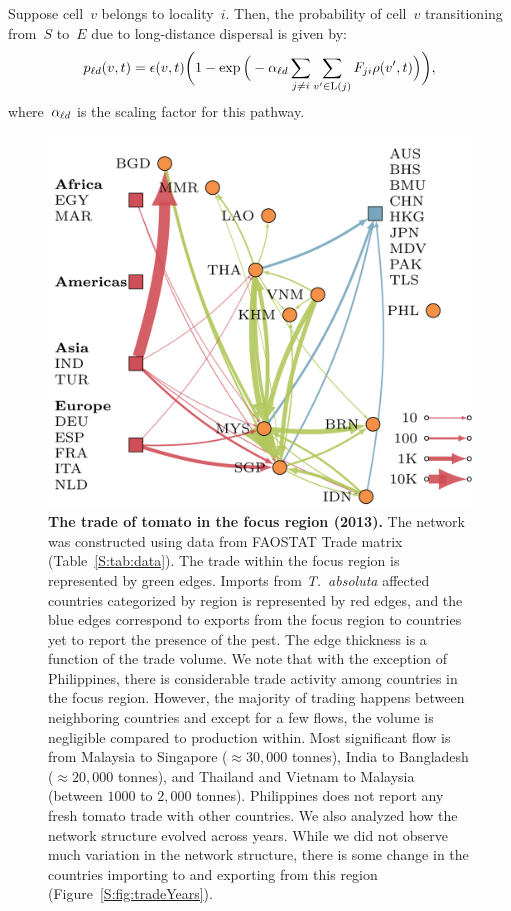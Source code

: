 \documentclass[11pt]{article}
\newcommand{\tuta}{\emph{T.~absoluta}}
\newcommand{\infest}{\rho}
\newcommand{\suitable}{\epsilon}
\theoremstyle{definition}
\begin{document}
Suppose cell~$v$ belongs to locality~$i$. Then, the probability of cell~$v$
transitioning from~$S$ to~$E$ due to long-distance dispersal is given by:
\begin{align}\label{eqn:plocal}
    \pld(v,t)=\suitable(v,t)\bigg(1-
    \exp\Big(-\ald\sum_{j\ne i}\sum_{v'\in\locality(j)}F_{ji}\infest(v',t)\Big)\bigg),
\end{align}
where~$\alpha_{\ell d}$ is the scaling factor for this pathway.
\begin{figure}[t]
\centering
\includegraphics[width=.6\textwidth]{../international_trade/results/network_plots/sea_2013_tomato.pdf}
\caption{\textbf{The trade of tomato in the focus region (2013).} The
network was constructed using data from FAOSTAT Trade matrix
(Table~\ref{S:tab:data}).  The trade within the focus region is represented
by green edges. Imports from \tuta{} affected countries categorized by
region is represented by red edges, and the blue edges correspond to
exports from the focus region to countries yet to report the presence of
the pest. The edge thickness is a function of the trade volume. We note
that with the exception of Philippines, there is considerable trade
activity among countries in the focus region. However, the majority of
trading happens between neighboring countries and except for a few flows,
the volume is negligible compared to production within. Most significant
flow is from Malaysia to Singapore ($\approx30,000$ tonnes), India to
Bangladesh ($\approx20,000$ tonnes), and Thailand and Vietnam to Malaysia
(between $1000$ to $2,000$ tonnes). Philippines does not report any fresh
tomato trade with other countries.  We also analyzed how the network
structure evolved across years. While we did not observe much variation in
the network structure, there is some change in the countries importing to
and exporting from this region
(Figure~\ref{S:fig:tradeYears}).\label{fig:tomnet}}
\end{figure}
\end{document}
